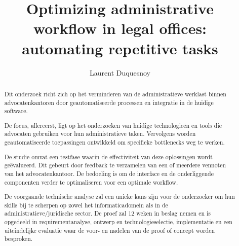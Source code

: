 \documentclass{hogent-article}
\title{Optimizing administrative workflow in legal offices: automating repetitive tasks}
\author{Laurent Duquesnoy}
\begin{document}
\begin{abstract}
  Dit onderzoek richt zich op het verminderen van de administratieve werklast binnen advocatenkantoren door geautomatiseerde processen en integratie in de huidige software. 

  De focus, allereerst, ligt op het onderzoeken van huidige technologieën en tools die advocaten gebruiken voor hun administratieve taken. Vervolgens worden geautomatiseerde toepassingen ontwikkeld om specifieke bottlenecks weg te werken. 

  De studie omvat een testfase waarin de effectiviteit van deze oplossingen wordt geëvalueerd. Dit gebeurt door feedback te verzamelen van een of meerdere vennoten van het advocatenkantoor. De bedoeling is om de interface en de onderliggende componenten verder te optimaliseren voor een optimale workflow. 

  De voorgaande technische analyse zal een unieke kans zijn voor de onderzoeker om hun skills bij te scherpen op zowel het informaticadomein als in de administratieve/juridische sector. De proef zal 12 weken in beslag nemen en is opgedeeld in requirementanalyse, ontwerp en technologieselectie, implementatie en een uiteindelijke evaluatie waar de voor- en nadelen van de proof of concept worden besproken. 
\end{abstract}
\tableofcontents



\printbibliography[heading=bibintoc]
\end{document}
